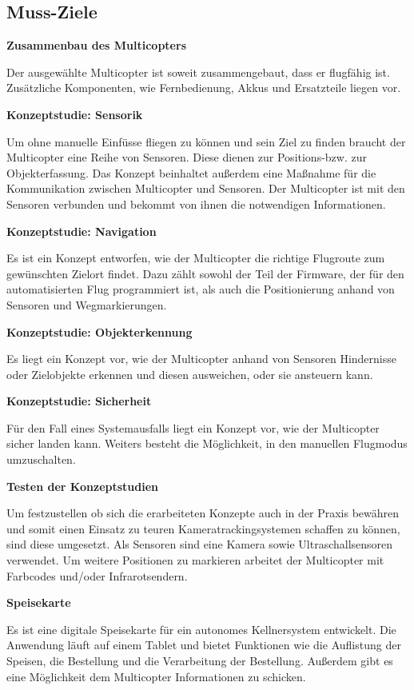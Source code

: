   \subsection{Muss-Ziele}
  \textbf{Zusammenbau des Multicopters}

  Der ausgewählte Multicopter ist soweit zusammengebaut, dass er flugfähig ist.
  Zusätzliche Komponenten, wie Fernbedienung, Akkus und Ersatzteile liegen vor.

  \textbf{Konzeptstudie: Sensorik}

  Um ohne manuelle Einfüsse fliegen zu können und sein Ziel zu finden braucht der Multicopter eine Reihe
  von Sensoren. Diese dienen zur Positions-bzw. zur Objekterfassung. Das Konzept beinhaltet außerdem eine
  Maßnahme für die Kommunikation zwischen Multicopter und Sensoren.
  Der Multicopter ist mit den Sensoren verbunden und bekommt von ihnen die notwendigen Informationen.

  \textbf{Konzeptstudie: Navigation}

  Es ist ein Konzept entworfen, wie der Multicopter die richtige Flugroute zum gewünschten
  Zielort findet. Dazu zählt sowohl der Teil der Firmware, der für den automatisierten Flug programmiert ist,
  als auch die Positionierung anhand von Sensoren und Wegmarkierungen.

  \textbf{Konzeptstudie: Objekterkennung}

  Es liegt ein Konzept vor, wie der Multicopter anhand von Sensoren Hindernisse oder Zielobjekte
  erkennen und diesen ausweichen, oder sie ansteuern kann.

  \textbf{Konzeptstudie: Sicherheit}

  Für den Fall eines Systemausfalls liegt ein Konzept vor, wie der Multicopter sicher landen kann.
  Weiters besteht die Möglichkeit, in den manuellen Flugmodus umzuschalten.

  \textbf{Testen der Konzeptstudien}

  Um festzustellen ob sich die erarbeiteten Konzepte auch in der Praxis bewähren und somit einen Einsatz zu
  teuren Kameratrackingsystemen schaffen zu können, sind diese umgesetzt. Als Sensoren sind eine Kamera
  sowie Ultraschallsensoren verwendet. Um weitere Positionen zu markieren arbeitet der Multicopter mit
  Farbcodes und/oder Infrarotsendern.

  \textbf{Speisekarte}

  Es ist eine digitale Speisekarte für ein autonomes Kellnersystem entwickelt.
  Die Anwendung läuft auf einem Tablet und bietet Funktionen wie die Auflistung der Speisen,
  die Bestellung und die Verarbeitung der Bestellung.
  Außerdem gibt es eine Möglichkeit dem Multicopter Informationen zu schicken.

